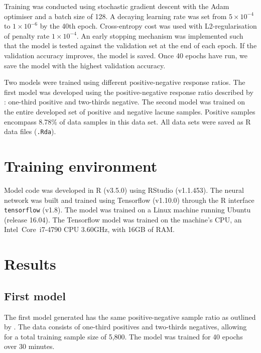 Training was conducted using stochastic gradient descent with the Adam optimiser and a batch size of 128. A decaying learning rate was set from $5\times10^{-4}$ to $1\times10^{-6}$ by the 40th epoch. Cross-entropy cost was used with L2-regularisation of penalty rate $1\times10^{-4}$. An early stopping mechanism was implemented such that the model is tested against the validation set at the end of each epoch. If the validation accuracy improves, the model is saved. Once 40 epochs have run, we save the model with the highest validation accuracy.

Two models were trained using different positive-negative response ratios. The first model was developed using the positive-negative response ratio described by \cite{GhafoorianM.2017Dml3}: one-third positive and two-thirds negative. The second model was trained on the entire developed set of positive and negative lacune samples. Positive samples encompass 8.78\% of data samples in this data set. All data sets were saved as R data files (\texttt{.Rda}).






\section{Training environment}

Model code was developed in R (v3.5.0) using RStudio (v1.1.453). The neural network was built and trained using Tensorflow (v1.10.0) through the R interface \texttt{tensorflow} (v1.8). The model was trained on a Linux machine running Ubuntu (release 16.04). The Tensorflow model was trained on the machine's CPU, an Intel\textregistered\ Core\texttrademark\ i7-4790 CPU 3.60GHz, with 16GB of RAM. 

\section{Results}\label{results-modresults}

\subsection*{First model}

The first model generated has the same positive-negative sample ratio as outlined by \cite{GhafoorianM.2017Dml3}. The data consists of one-third positives and two-thirds negatives, allowing for a total training sample size of 5,800. The model was trained for 40 epochs over 30 minutes.


